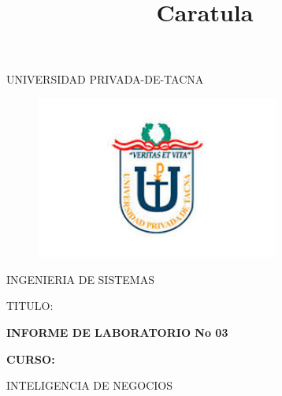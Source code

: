\documentclass[12pt,letterpaper]{article}
\begin{document}
%


\title{Caratula}

\begin{titlepage}
\begin{center}
\large{UNIVERSIDAD PRIVADA-DE-TACNA}\\
\vspace*{-0.025in}
\begin{figure}[htb]
\begin{center}
\includegraphics[width=8cm]{./Imagenes/logo}
\end{center}
\end{figure}
\vspace*{0.15in}
INGENIERIA DE SISTEMAS  \\

\vspace*{0.5in}
\begin{large}
TITULO:\\
\end{large}

\vspace*{0.1in}
\begin{Large}
\textbf{INFORME DE LABORATORIO No 03} \\
\end{Large}

\vspace*{0.3in}
\begin{Large}
\textbf{CURSO:} \\
\end{Large}

\vspace*{0.1in}
\begin{large}
INTELIGENCIA DE NEGOCIOS\\
\end{large}


\end{center}
\end{titlepage}
\end{document}
